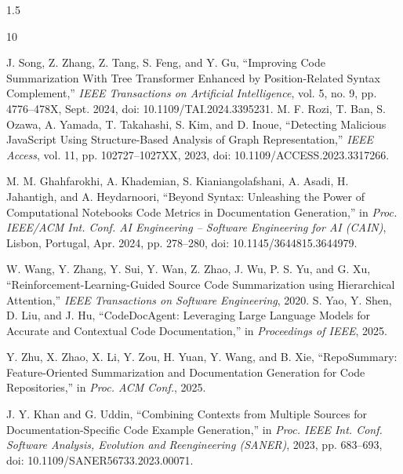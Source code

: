 \documentclass{cls/thesis}
\begin{document}
\fontsize{12}{12}\selectfont	
\pagestyle{fancy}
\begin{spacing}{1.5}
\justifying 









%
%


\newpage
\begin{thebibliography}{10}

J. Song, Z. Zhang, Z. Tang, S. Feng, and Y. Gu,
``Improving Code Summarization With Tree Transformer Enhanced by Position-Related Syntax Complement,''
\emph{IEEE Transactions on Artificial Intelligence}, vol. 5, no. 9, pp. 4776--478X, Sept. 2024, doi: 10.1109/TAI.2024.3395231.
M. F. Rozi, T. Ban, S. Ozawa, A. Yamada, T. Takahashi, S. Kim, and D. Inoue,
``Detecting Malicious JavaScript Using Structure-Based Analysis of Graph Representation,''
\emph{IEEE Access}, vol. 11, pp. 102727--1027XX, 2023, doi: 10.1109/ACCESS.2023.3317266.

M. M. Ghahfarokhi, A. Khademian, S. Kianiangolafshani, A. Asadi, H. Jahantigh, and A. Heydarnoori,
``Beyond Syntax: Unleashing the Power of Computational Notebooks Code Metrics in Documentation Generation,''
in \emph{Proc. IEEE/ACM Int. Conf. AI Engineering -- Software Engineering for AI (CAIN)}, Lisbon, Portugal, Apr. 2024, pp. 278--280, doi: 10.1145/3644815.3644979.

W. Wang, Y. Zhang, Y. Sui, Y. Wan, Z. Zhao, J. Wu, P. S. Yu, and G. Xu,
``Reinforcement-Learning-Guided Source Code Summarization using Hierarchical Attention,''
\emph{IEEE Transactions on Software Engineering}, 2020.
S. Yao, Y. Shen, D. Liu, and J. Hu,
``CodeDocAgent: Leveraging Large Language Models for Accurate and Contextual Code Documentation,''
in \emph{Proceedings of IEEE}, 2025.

Y. Zhu, X. Zhao, X. Li, Y. Zou, H. Yuan, Y. Wang, and B. Xie,
``RepoSummary: Feature-Oriented Summarization and Documentation Generation for Code Repositories,''
in \emph{Proc. ACM Conf.}, 2025.

J. Y. Khan and G. Uddin,
``Combining Contexts from Multiple Sources for Documentation-Specific Code Example Generation,''
in \emph{Proc. IEEE Int. Conf. Software Analysis, Evolution and Reengineering (SANER)}, 2023, pp. 683--693, doi: 10.1109/SANER56733.2023.00071.


\end{thebibliography}
\end{spacing}
\end{document}
